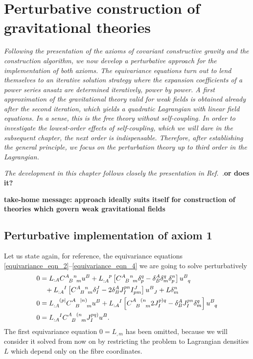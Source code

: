 \chapter{Perturbative construction of gravitational theories}
\label{chapter_perturbation}

\textit{Following the presentation of the axioms of covariant constructive gravity and the construction algorithm, we now develop a perturbative approach for the implementation of both axioms. The equivariance equations turn out to lend themselves to an iterative solution strategy where the expansion coefficients of a power series ansatz are determined iteratively, power by power. A first approximation of the gravitational theory valid for weak fields is obtained already after the second iteration, which yields a quadratic Lagrangian with linear field equations. In a sense, this is the free theory without self-coupling. In order to investigate the lowest-order effects of self-coupling, which we will dare in the subsequent chapter, the next order is indispensable. Therefore, after establishing the general principle, we focus on the perturbation theory up to third order in the Lagrangian.}

\textit{The development in this chapter follows closely the presentation in Ref.~\cite{ccg_paper}.}\textbf{or does it?}

\textbf{take-home message: approach ideally suits itself for construction of theories which govern weak gravitational fields}

\section{Perturbative implementation of axiom 1}

Let us state again, for reference, the equivariance equations \eqref{equivariance_eqn_2}--\eqref{equivariance_eqn_4} we are going to solve perturbatively
\begin{equation*}
    \begin{aligned}
      0 &{} = L_{:A} \gmc{A}{B}{n}{m}u^B + L_{:A}^{\hphantom{:A}p}\left\lbrack\gmc{A}{B}{n}{m} \delta^q_p - \delta^A_B\delta^q_m\delta^n_p\right\rbrack u^{B}_{\hphantom Bq} \nonumber \\
        &{} \hphantom{=} + L_{:A}^{\hphantom{:A}I} \left\lbrack\gmc{A}{B}{n}{m} \delta^J_I - 2 \delta^A_B J^{pn}_{I} I^J_{pm}\right\rbrack u^B_{\hphantom BJ} + L\delta^n_m \\
      0 &{} = L_{:A}^{\hphantom{:A}(p\mid} \gmc{A}{B}{\mid n)}{m} u^B + L_{:A}^{\hphantom{:A}I}\left\lbrack\gmc{A}{B}{(n}{m} 2J^{p)q}_I - \delta^A_B J^{pn}_I \delta^q_m\right\rbrack u^B_{\hphantom Bq} \\
      0 &{} = L_{:A}^{\hphantom{:A}I} \gmc{A}{B}{(n}{m} J^{pq)}_I u^B.
    \end{aligned}
\end{equation*}
The first equivariance equation $0 = L_{,m}$ has been omitted, because we will consider it solved from now on by restricting the problem to Lagrangian densities $L$ which depend only on the fibre coordinates.

